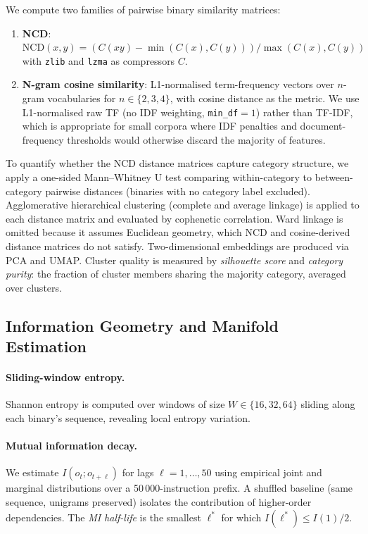 \documentclass[10pt,twocolumn]{article}
\newcommand{\ncd}{\mathrm{NCD}} %
\newcommand{\zlib}{\texttt{zlib}}
\newcommand{\lzma}{\texttt{lzma}}
\begin{document}
We compute two families of pairwise binary similarity matrices:
\begin{enumerate}
  \item \textbf{NCD}: $\ncd(x, y) = (C(xy) - \min(C(x), C(y))) / \max(C(x), C(y))$
        with \zlib{} and \lzma{} as compressors $C$.
  \item \textbf{N-gram cosine similarity}: L1-normalised term-frequency vectors
        over $n$-gram vocabularies for $n \in \{2,3,4\}$, with cosine distance
        as the metric.  We use L1-normalised raw TF (no IDF weighting,
        \texttt{min\_df}$=1$) rather than TF-IDF, which is appropriate for
        small corpora where IDF penalties and document-frequency thresholds
        would otherwise discard the majority of features.
\end{enumerate}
To quantify whether the NCD distance matrices capture category structure, we
apply a one-sided Mann--Whitney U test comparing within-category to
between-category pairwise distances (binaries with no category label excluded).
Agglomerative hierarchical clustering (complete and average linkage) is
applied to each distance matrix and evaluated by cophenetic correlation.
Ward linkage is omitted because it assumes Euclidean geometry, which NCD
and cosine-derived distance matrices do not satisfy.
Two-dimensional embeddings are produced via PCA and UMAP.  Cluster
quality is measured by \emph{silhouette score} and \emph{category purity}:
the fraction of cluster members sharing the majority category, averaged over
clusters.

\subsection{Information Geometry and Manifold Estimation}

\paragraph{Sliding-window entropy.}
Shannon entropy is computed over windows of size $W \in \{16, 32, 64\}$
sliding along each binary's sequence, revealing local entropy variation.

\paragraph{Mutual information decay.}
We estimate $I(o_t; o_{t+\ell})$ for lags $\ell = 1, \ldots, 50$ using
empirical joint and marginal distributions over a 50\,000-instruction prefix.
A shuffled baseline (same sequence, unigrams preserved) isolates the
contribution of higher-order dependencies.  The \emph{MI half-life} is the
smallest $\ell^*$ for which $I(\ell^*) \leq I(1)/2$.
\end{document}
